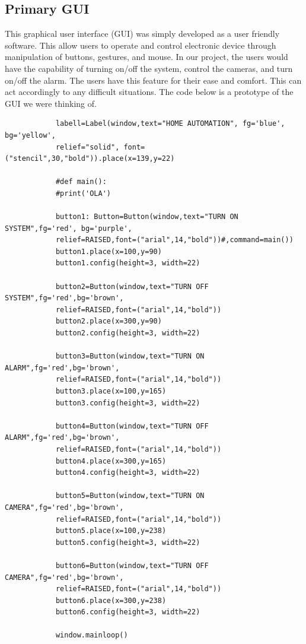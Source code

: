 	\subsection{Primary GUI}
			\par This graphical user interface (GUI) was simply developed as a user friendly software. This allow users to operate and control electronic device through manipulation of buttons, gestures, and mouse. In our project, the users would have the capability of turning on/off the system, control the cameras, and turn on/off the alarm. The users have this feature for their ease and comfort. This can act accordingly to any difficult situations. The code below is a prototype of the GUI we were thinking of.  
			\begin{lstlisting}
			labell=Label(window,text="HOME AUTOMATION", fg='blue', bg='yellow', 
			relief="solid", font=("stencil",30,"bold")).place(x=139,y=22)
			
			#def main():
			#print('OLA')
			
			button1: Button=Button(window,text="TURN ON SYSTEM",fg='red', bg='purple',
			relief=RAISED,font=("arial",14,"bold"))#,command=main())
			button1.place(x=100,y=90)
			button1.config(height=3, width=22)
			
			button2=Button(window,text="TURN OFF SYSTEM",fg='red',bg='brown',
			relief=RAISED,font=("arial",14,"bold"))
			button2.place(x=300,y=90)
			button2.config(height=3, width=22)
			
			button3=Button(window,text="TURN ON ALARM",fg='red',bg='brown',
			relief=RAISED,font=("arial",14,"bold"))
			button3.place(x=100,y=165)
			button3.config(height=3, width=22)
			
			button4=Button(window,text="TURN OFF ALARM",fg='red',bg='brown',
			relief=RAISED,font=("arial",14,"bold"))
			button4.place(x=300,y=165)
			button4.config(height=3, width=22)
			
			button5=Button(window,text="TURN ON CAMERA",fg='red',bg='brown',
			relief=RAISED,font=("arial",14,"bold"))
			button5.place(x=100,y=238)
			button5.config(height=3, width=22)
			
			button6=Button(window,text="TURN OFF CAMERA",fg='red',bg='brown',
			relief=RAISED,font=("arial",14,"bold"))
			button6.place(x=300,y=238)
			button6.config(height=3, width=22)
			
			window.mainloop()
			\end{lstlisting}
